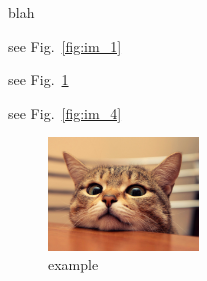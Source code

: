 \documentclass[../PICOReport.tex]{subfiles}
\begin{document}
blah

see Fig.~\ref{fig:im_1}

see Fig.~\ref{fig:im_2}

see Fig.~\ref{fig:im_4}

\begin{figure}[!htb]
\centering
\includegraphics[width=4cm]{../images/example}
\caption{example}
\label{fig:im_2}
\end{figure}
\end{document}
